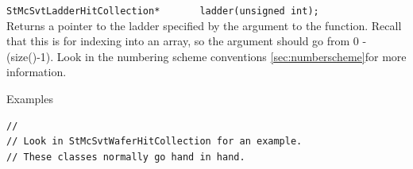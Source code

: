 \begin{Entry}
    \verb+StMcSvtLadderHitCollection*       ladder(unsigned int);+\\
    Returns a pointer to the ladder specified by the argument to the
    function.  Recall that this is for indexing into an array, so the
    argument should go from 0 - (size()-1).  Look in the
    numbering scheme conventions \ref{sec:numberscheme}for more information.

\item[Examples]
{\footnotesize
\begin{verbatim}
//
// Look in StMcSvtWaferHitCollection for an example.
// These classes normally go hand in hand.
\end{verbatim}
}%
\end{Entry}

\clearpage
%
%
